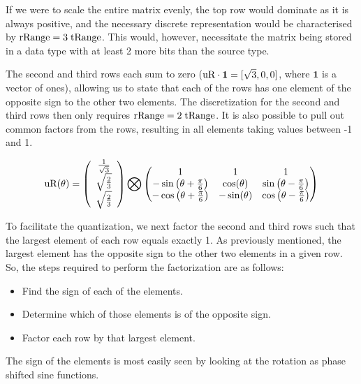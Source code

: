 If we were to scale the entire matrix evenly, the top row would dominate as it is always positive, and the necessary discrete representation would be characterised by $\text{rRange} = 3 \; \text{tRange}$. This would, however, necessitate the matrix being stored in a data type with at least 2 more bits than the source type.

The second and third rows each sum to zero ($\text{uR} \cdot \mathbf{1} = [\sqrt{3},0,0]$, where $\mathbf{1}$ is a vector of ones), allowing us to state that each of the rows has one element of the opposite sign to the other two elements. The discretization for the second and third rows then only requires $\text{rRange} = 2 \; \text{tRange}$. It is also possible to pull out common factors from the rows, resulting in all elements taking values between -1 and 1.

\begin{equation}\label{eq:RotCommonFactors}
\text{uR}(\theta) =
\left(
\begin{array}{c}
 \frac{1}{\sqrt{3}} \\
 \sqrt{\frac{2}{3}}  \\
 \sqrt{\frac{2}{3}} \\
\end{array}
\right) \bigotimes
\begin{pmatrix}
 1 & 1 & 1 \\
 -\sin \left(\theta +\frac{\pi}{6}\right) &  \cos (\theta ) &  \sin \left(\theta -\frac{\pi}{6}\right) \\
 -\cos \left(\theta +\frac{\pi}{6}\right) & - \sin (\theta ) & \cos \left(\theta -\frac{\pi}{6}\right) \\
\end{pmatrix}
\end{equation}

To facilitate the quantization, we next factor the second and third rows such that the largest element of each row equals exactly 1. As previously mentioned, the largest element has the opposite sign to the other two elements in a given row. So, the steps required to perform the factorization are as follows:

\begin{itemize}
\item{Find the sign of each of the elements.}
\item{Determine which of those elements is of the opposite sign.}
\item{Factor each row by that largest element.}
\end{itemize}

The sign of the elements is most easily seen by looking at the rotation as phase shifted sine functions.

